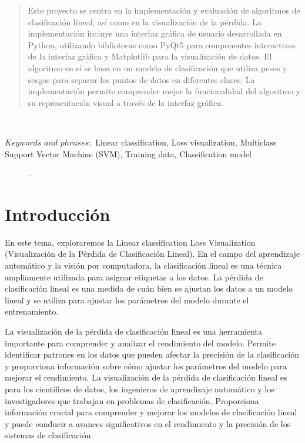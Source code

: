 \documentclass[twoside,10pt]{article}
\numberwithin{equation}{section}
\begin{document}
\renewcommand{\abstractname}{Resumen}
\begin{abstract}
Este proyecto se centra en la implementación y evaluación de algoritmos de clasificación lineal, así como en la visualización de la pérdida. La implementación incluye una interfaz gráfica de usuario desarrollada en Python, utilizando bibliotecas como PyQt5 para componentes interactivos de la interfaz gráfica y Matplotlib para la visualización de datos. El algoritmo en sí se basa en un modelo de clasificación que utiliza pesos y sesgos para separar los puntos de datos en diferentes clases. La implementación permite comprender mejor la funcionalidad del algoritmo y su representación visual a través de la interfaz gráfica.
\end{abstract}


$\underline{ \ \ \ \ \ \ \ \ \ \ \  \ \ \ \ \ \ \ \ \ \ \ \ \ \ \ \
\ }$

{\footnotesize $Keywords$ $and$ $phrases:$ Linear classification,
Loss visualization, Multiclass Support Vector Machine (SVM), Training data, Classification model}


$\overline{ \ \ \ \ \ \ \ \ \ \ \  \ \ \ \ \ \ \ \ \ \ \ \ \ \ \ \ \
}$
\section{Introducción}

En este tema, exploraremos la Linear classification Loss Visualization (Visualización de la Pérdida de Clasificación Lineal). En el campo del aprendizaje automático y la visión por computadora, la clasificación lineal es una técnica ampliamente utilizada para asignar etiquetas a los datos. La pérdida de clasificación lineal es una medida de cuán bien se ajustan los datos a un modelo lineal y se utiliza para ajustar los parámetros del modelo durante el entrenamiento.

La visualización de la pérdida de clasificación lineal es una herramienta importante para comprender y analizar el rendimiento del modelo. Permite identificar patrones en los datos que pueden afectar la precisión de la clasificación y proporciona información sobre cómo ajustar los parámetros del modelo para mejorar el rendimiento. La visualización de la pérdida de clasificación lineal es para los científicos de datos, los ingenieros de aprendizaje automático y los investigadores que trabajan en problemas de clasificación. Proporciona información crucial para comprender y mejorar los modelos de clasificación lineal y puede conducir a avances significativos en el rendimiento y la precisión de los sistemas de clasificación.
\end{document}
